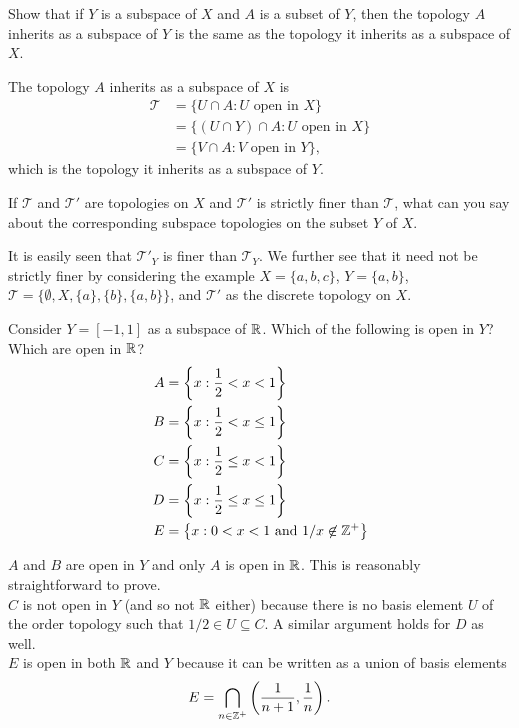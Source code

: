 	\begin{exercise}
		Show that if $Y$ is a subspace of $X$ and $A$ is a subset of $Y$, then the topology $A$ inherits as a subspace of $Y$ is the same as the topology it inherits as a subspace of $X$.
	\end{exercise}
	\begin{solution*}	
		The topology $A$ inherits as a subspace of $X$ is
		\begin{align*}
			\mathcal{T} &= \{ U\cap A : U\text{ open in }X \} \\
				&= \{ (U\cap Y) \cap A : U\text{ open in }X \} \\
				&= \{ V\cap A : V\text{ open in }Y \},
		\end{align*}
		which is the topology it inherits as a subspace of $Y$.
	\end{solution*}

	\begin{exercise}
		If $\mathcal{T}$ and $\mathcal{T}'$ are topologies on $X$ and $\mathcal{T}'$ is strictly finer than $\mathcal{T}$, what can you say about the corresponding subspace topologies on the subset $Y$ of $X$.
	\end{exercise}
	\begin{solution*}
		It is easily seen that $\mathcal{T}'_Y$ is finer than $\mathcal{T}_Y$. We further see that it need not be strictly finer by considering the example $X=\{a,b,c\}$, $Y=\{a,b\}$, $\mathcal{T}=\{\emptyset,X,\{a\},\{b\},\{a,b\}\}$, and $\mathcal{T}'$ as the discrete topology on $X$.
	\end{solution*}

	\begin{exercise}
		Consider $Y=[-1,1]$ as a subspace of $\mathbb{R}$. Which of the following is open in $Y$? Which are open in $\mathbb{R}$?
		\begin{align*}
			A &= \left\{ x : \frac{1}{2} < x < 1 \right\} \\
			B &= \left\{ x : \frac{1}{2} < x \leq 1 \right\} \\
			C &= \left\{ x : \frac{1}{2} \leq x < 1 \right\} \\
			D &= \left\{ x : \frac{1}{2} \leq x \leq 1 \right\} \\
			E &= \left\{ x : 0 < x < 1 \text{ and } 1/x\not\in\mathbb{Z}^+ \right\}
		\end{align*}
	\end{exercise}
	\begin{solution*}
		$A$ and $B$ are open in $Y$ and only $A$ is open in $\mathbb{R}$. This is reasonably straightforward to prove.\\
		$C$ is not open in $Y$ (and so not $\mathbb{R}$ either) because there is no basis element $U$ of the order topology such that $1/2 \in U \subseteq C$. A similar argument holds for $D$ as well.\\
		$E$ is open in both $\mathbb{R}$ and $Y$ because it can be written as a union of basis elements
		\[ E = \bigcap_{n\in\mathbb{Z}^+} \left(\frac{1}{n+1},\frac{1}{n}\right). \]
	\end{solution*}

